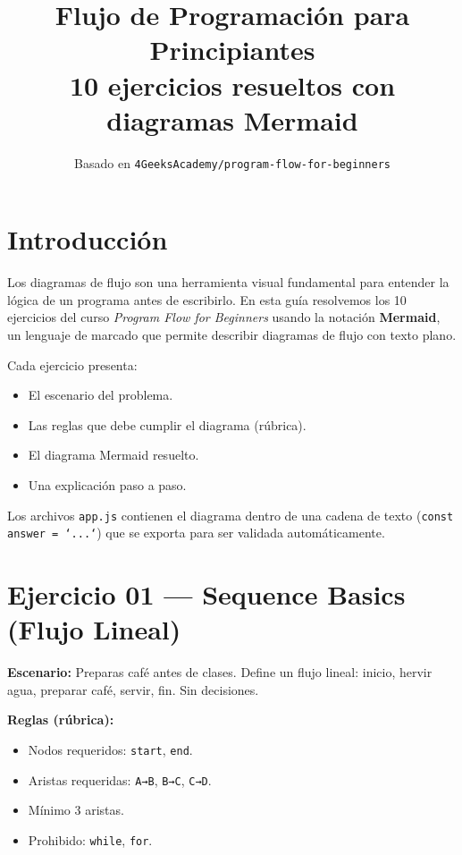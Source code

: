 \documentclass[10pt,a4paper]{article}
\title{\textbf{Flujo de Programación para Principiantes}\\[6pt]
       \large 10 ejercicios resueltos con diagramas Mermaid}
\author{Basado en \texttt{4GeeksAcademy/program-flow-for-beginners}}
\date{}
\begin{document}
\maketitle

\tableofcontents
\newpage

\section{Introducción}

Los diagramas de flujo son una herramienta visual fundamental para entender
la lógica de un programa antes de escribirlo. En esta guía resolvemos los
10 ejercicios del curso \emph{Program Flow for Beginners} usando la
notación \textbf{Mermaid}, un lenguaje de marcado que permite describir
diagramas de flujo con texto plano.

Cada ejercicio presenta:
\begin{itemize}[nosep]
  \item El escenario del problema.
  \item Las reglas que debe cumplir el diagrama (rúbrica).
  \item El diagrama Mermaid resuelto.
  \item Una explicación paso a paso.
\end{itemize}

Los archivos \texttt{app.js} contienen el diagrama dentro de una cadena
de texto (\texttt{const answer = `...`}) que se exporta para ser validada
automáticamente.

\newpage

\section{Ejercicio 01 — Sequence Basics (Flujo Lineal)}

\textbf{Escenario:} Preparas café antes de clases. Define un flujo
lineal: inicio, hervir agua, preparar café, servir, fin. Sin decisiones.

\textbf{Reglas (rúbrica):}
\begin{itemize}
  \item Nodos requeridos: \texttt{start}, \texttt{end}.
  \item Aristas requeridas: \texttt{A→B}, \texttt{B→C}, \texttt{C→D}.
  \item Mínimo 3 aristas.
  \item Prohibido: \texttt{while}, \texttt{for}.
\end{itemize}
\end{document}
